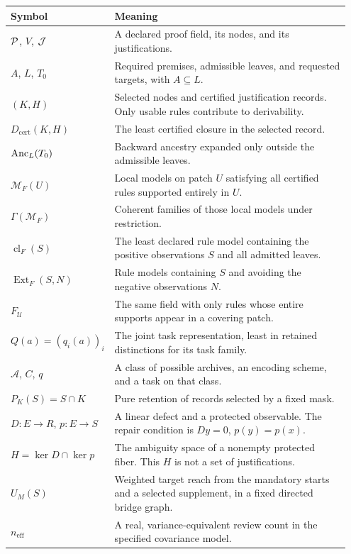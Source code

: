 \documentclass[11pt,oneside,openany]{book}
\numberwithin{equation}{section}
\begin{document}
\begingroup\small
\begin{longtable}{@{}L{0.24\linewidth}L{0.71\linewidth}@{}}
\toprule
Symbol & Meaning \\
\midrule
\endhead
$\mathcal P$, $V$, $\mathcal J$ & A declared proof field, its nodes, and its justifications. \\
$A$, $L$, $T_0$ & Required premises, admissible leaves, and requested targets, with $A\subseteq L$. \\
$(K,H)$ & Selected nodes and certified justification records. Only usable rules contribute to derivability. \\
$D_{\mathrm{cert}}(K,H)$ & The least certified closure in the selected record. \\
$\operatorname{Anc}_L(T_0)$ & Backward ancestry expanded only outside the admissible leaves. \\
$\mathcal M_F(U)$ & Local models on patch $U$ satisfying all certified rules supported entirely in $U$. \\
$\Gamma(\mathcal M_F)$ & Coherent families of those local models under restriction. \\
$\operatorname{cl}_F(S)$ & The least declared rule model containing the positive observations $S$ and all admitted leaves. \\
$\operatorname{Ext}_F(S,N)$ & Rule models containing $S$ and avoiding the negative observations $N$. \\
$F_{\mathcal U}$ & The same field with only rules whose entire supports appear in a covering patch. \\
$Q(a)=(q_i(a))_i$ & The joint task representation, least in retained distinctions for its task family. \\
$\mathscr A$, $C$, $q$ & A class of possible archives, an encoding scheme, and a task on that class. \\
$P_K(S)=S\cap K$ & Pure retention of records selected by a fixed mask. \\
$D:E\to R$, $p:E\to S$ & A linear defect and a protected observable. The repair condition is $Dy=0$, $p(y)=p(x)$. \\
$H=\ker D\cap\ker p$ & The ambiguity space of a nonempty protected fiber. This $H$ is not a set of justifications. \\
$U_M(S)$ & Weighted target reach from the mandatory starts and a selected supplement, in a fixed directed bridge graph. \\
$n_{\mathrm{eff}}$ & A real, variance-equivalent review count in the specified covariance model. \\
\bottomrule
\end{longtable}
\endgroup
\end{document}
